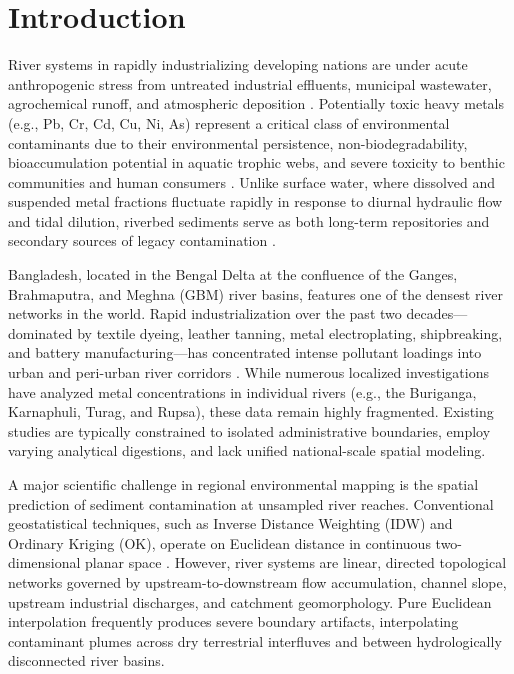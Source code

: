 \documentclass[authoryear,preprint,12pt]{elsarticle}
\begin{document}
\linenumbers

\section{Introduction}
River systems in rapidly industrializing developing nations are under acute anthropogenic stress from untreated industrial effluents, municipal wastewater, agrochemical runoff, and atmospheric deposition \citep{Islam2015,Ali2021}. Potentially toxic heavy metals (e.g., Pb, Cr, Cd, Cu, Ni, As) represent a critical class of environmental contaminants due to their environmental persistence, non-biodegradability, bioaccumulation potential in aquatic trophic webs, and severe toxicity to benthic communities and human consumers \citep{Tessier1979,Hakanson1980}. Unlike surface water, where dissolved and suspended metal fractions fluctuate rapidly in response to diurnal hydraulic flow and tidal dilution, riverbed sediments serve as both long-term repositories and secondary sources of legacy contamination \citep{Ahmad2010}.

Bangladesh, located in the Bengal Delta at the confluence of the Ganges, Brahmaputra, and Meghna (GBM) river basins, features one of the densest river networks in the world. Rapid industrialization over the past two decades---dominated by textile dyeing, leather tanning, metal electroplating, shipbreaking, and battery manufacturing---has concentrated intense pollutant loadings into urban and peri-urban river corridors \citep{Islam2018,Acharjee2022}. While numerous localized investigations have analyzed metal concentrations in individual rivers (e.g., the Buriganga, Karnaphuli, Turag, and Rupsa), these data remain highly fragmented. Existing studies are typically constrained to isolated administrative boundaries, employ varying analytical digestions, and lack unified national-scale spatial modeling.

A major scientific challenge in regional environmental mapping is the spatial prediction of sediment contamination at unsampled river reaches. Conventional geostatistical techniques, such as Inverse Distance Weighting (IDW) and Ordinary Kriging (OK), operate on Euclidean distance in continuous two-dimensional planar space \citep{Cressie1993}. However, river systems are linear, directed topological networks governed by upstream-to-downstream flow accumulation, channel slope, upstream industrial discharges, and catchment geomorphology. Pure Euclidean interpolation frequently produces severe boundary artifacts, interpolating contaminant plumes across dry terrestrial interfluves and between hydrologically disconnected river basins.
\end{document}
